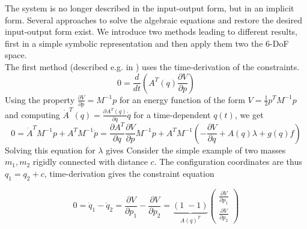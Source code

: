 \documentclass[a4paper,twoside, openright,12pt]{report}
\begin{document}
The system is no longer described in the input-output form, but in an implicit form. Several approaches to solve the algebraic equations and restore the desired input-output form exist. We introduce two methods leading to different results, first in a simple symbolic representation and then apply them two the 6-DoF space.\\
The first method (described e.g. in \cite{Duindam_09}) uses the time-derivation of the constraints.
\begin{equation}
0 = \frac{d}{dt}\left(A^T(q)\frac{\partial V}{\partial p}\right)
\end{equation}
Using the property $\frac{\partial V}{\partial p}=M^{-1}p$ for an energy function of the form $V = \frac{1}{2}p^TM^{-1}p$ and computing $\dot{A}^T(q)=\frac{\partial A^T(q)}{\partial q}\dot{q}$ for a time-dependent $q(t)$, we get
\begin{equation}
0 = \dot{A}^TM^{-1}p + A^TM^{-1}\dot{p} = \frac{\partial A^T}{\partial q}\frac{\partial V}{\partial p}M^{-1}p + A^TM^{-1}\left(-\frac{\partial V}{\partial q}+A(q)\lambda +g(q)f\right)
\end{equation}
Solving this equation for $\lambda$ gives
Consider the simple example of two masses $m_1,m_2$ rigidly connected with distance $c$.
The configuration coordinates are thus $q_1 = q_2 + c$, time-derivation gives the constraint equation

\begin{equation}
 0 = \dot{q}_1 - \dot{q}_2 = \frac{\partial V}{\partial p_1} - \frac{\partial V}{\partial p_2} = \underbrace{(1 \; -1)}_{A(q)^T} \begin{pmatrix}
\frac{\partial V}{\partial p_1} \\ \frac{\partial V}{\partial p_2}
\end{pmatrix} \end{equation}
\end{document}
